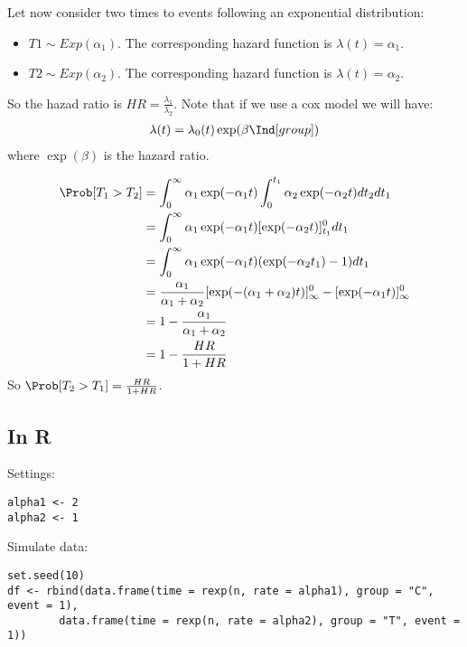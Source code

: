 \documentclass{article}
\begin{document}
\bigskip

Let now consider two times to events following an exponential distribution:
\begin{itemize}
\item \(T1 \sim Exp(\alpha_1)\). The corresponding hazard function is \(\lambda(t)=\alpha_1\).
\item \(T2 \sim Exp(\alpha_2)\). The corresponding hazard function is \(\lambda(t)=\alpha_2\).
\end{itemize}
So the hazad ratio is \(HR = \frac{\lambda_1}{\lambda_2}\). Note that if we use a cox model we will have:
\begin{align*}
\lambda(t) = \lambda_0(t) \exp(\beta \Ind[group])
\end{align*}
where \(\exp(\beta)\) is the hazard ratio.

\bigskip

\begin{align*}
\Prob[T_1>T_2] &= \int_{0}^{\infty}\alpha_1 \exp(-\alpha_1 t)  \int_0^{t_1} \alpha_2 \exp(-\alpha_2 t) dt_2 dt_1 \\
&= \int_{0}^{\infty}\alpha_1 \exp(-\alpha_1 t)  [ \exp(-\alpha_2 t) ]_{t_1}^{0} dt_1 \\
&= \int_{0}^{\infty}\alpha_1 \exp(-\alpha_1 t)  ( \exp(-\alpha_2 t_1) - 1 ) dt_1 \\
&= \frac{\alpha_1}{\alpha_1+\alpha_2} [\exp(-(\alpha_1+\alpha_2) t)]_{\infty}^{0} - [\exp(-\alpha_1 t)]_{\infty}^{0} \\
&= 1-\frac{\alpha_1}{\alpha_1+\alpha_2}\\
&= 1-\frac{HR}{1+HR}\\
\end{align*}
So \(\Prob[T_2>T_1]=\frac{HR}{1+HR}\).

\subsection{In R}
\label{sec:org9da9a72}

Settings:
\lstset{language=r,label= ,caption= ,captionpos=b,numbers=none}
\begin{lstlisting}
alpha1 <- 2
alpha2 <- 1
\end{lstlisting}

Simulate data:
\lstset{language=r,label= ,caption= ,captionpos=b,numbers=none}
\begin{lstlisting}
set.seed(10)
df <- rbind(data.frame(time = rexp(n, rate = alpha1), group = "C", event = 1),
	    data.frame(time = rexp(n, rate = alpha2), group = "T", event = 1))
\end{lstlisting}
\end{document}
